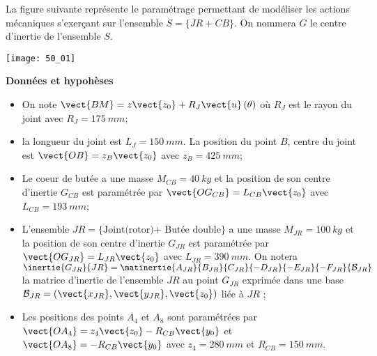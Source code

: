 \normaltrue \difficilefalse \tdifficilefalse
\correctionfalse


\setcounter{question}{0}%
\ifcorrection
\else
{}
\fi


\ifprof
\else
La figure suivante représente le paramétrage permettant de modéliser les actions mécaniques
s’exerçant sur l’ensemble $S=\{JR+CB\}$. On nommera $G$ le centre d’inertie de l’ensemble
$S$.


\begin{marginfigure}
\centering
\texttt{[image: 50\_01]}
\end{marginfigure}
\fi


\ifprof
\else
\textbf{Données et hypohèses}

\begin{itemize}
\item On note $\vect{BM}=z\vect{z_0}+R_J\vect{u}\left(\theta\right)$ où $R_J$ est le rayon du joint avec $R_J = \SI{175}{mm}$;
\item la longueur du joint est $L_J = \SI{150}{mm}$. La position du point $B$, centre du joint est $\vect{OB}=z_B\vect{z_0}$ avec $z_B = \SI{425}{mm}$;
\item Le coeur de butée a une masse $M_{CB} = \SI{40}{kg}$ et la position de son centre d’inertie $G_{CB}$ est paramétrée par $\vect{OG_{CB}}= L_{CB}\vect{z_0}$ avec $L_{CB} = \SI{193}{mm}$;
\item L’ensemble $JR=\{\text{Joint(rotor)+ Butée double}\}$ a une masse $M_{JR} = \SI{100}{kg}$ et la
position de son centre d’inertie $G_{JR}$ est paramétrée par $\vect{OG_{JR}}=L_{JR}\vect{z_0}$ avec $L_{JR}=
\SI{390}{mm}$. On notera $\inertie{G_{JR}}{JR} = \matinertie{A_{JR}}{B_{JR}}{C_{JR}}{-D_{JR}}{-E_{JR}}{-F_{JR}}{\mathcal{B}_{JR}}$ la matrice d’inertie de l’ensemble $JR$ au point $G_{JR}$ exprimée dans une base $\mathcal{B}_{JR} = \left(\vect{x_{JR}},\vect{y_{JR}},\vect{z_{0}}\right)$ liée à $JR$ ;
\item Les positions des points $A_4$ et $A_8$ sont paramétrées par $\vect{OA_4} = z_4\vect{z_0}-R_{CB}\vect{y_0}$ et
$\vect{OA_8}=-R_{CB}\vect{y_0}$ avec $z_4 = \SI{280}{mm}$ et $R_{CB}=\SI{150}{mm}$.
\end{itemize}
\fi

\ifprof
\else
\fi


\ifprof
\else
\fi



\ifprof
\else


\fi